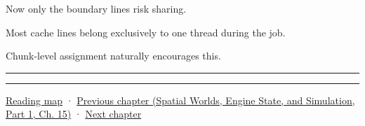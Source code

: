 Now only the boundary lines risk sharing.

Most cache lines belong exclusively to one thread during the job.

Chunk-level assignment naturally encourages this.

\begin{center}\rule{0.5\linewidth}{0.5pt}\end{center}

\begin{center}\rule{0.5\linewidth}{0.5pt}\end{center}

\hyperref[volume-reading-map]{Reading map} · \href{../05-Spatial-Worlds-Engine-State-and-Simulation-P01/main.pdf\#nameddest=05-engine-i-ch015-sparse-set-components-and-generational-entity-handles}{Previous chapter (Spatial Worlds, Engine State, and Simulation, Part 1, Ch. 15)} · \hyperref[05-engine-i-ch017-ecs-performance-through-cache-and-scheduling]{Next chapter}
